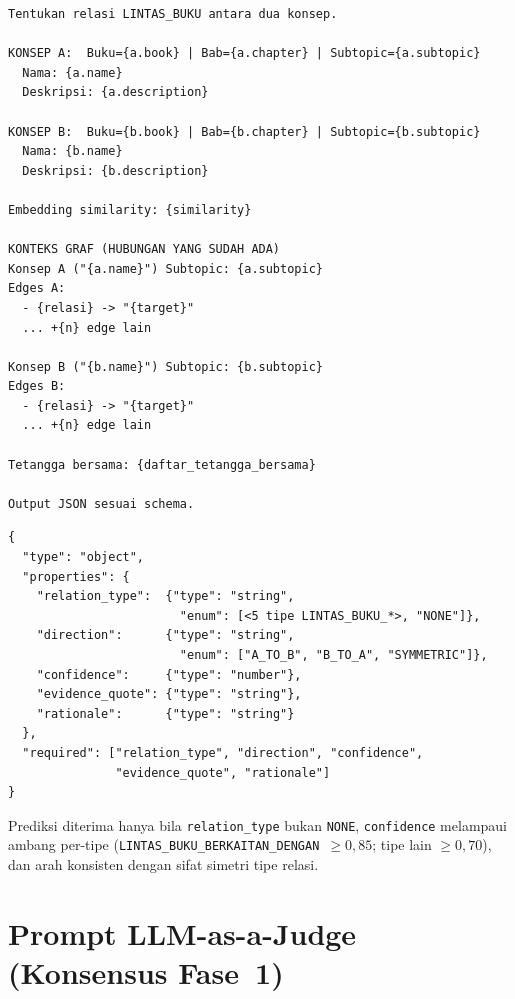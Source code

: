 \documentclass[main]{subfiles}
\begin{document}
\begin{lstlisting}[style=promptbox,caption={User prompt klasifikasi relasi (Pass-2). Blok \texttt{KONTEKS GRAF} memuat subtopik, hingga lima edge keluar tiap konsep, dan tetangga bersama.},label={lst:prompt-user}]
Tentukan relasi LINTAS_BUKU antara dua konsep.

KONSEP A:  Buku={a.book} | Bab={a.chapter} | Subtopic={a.subtopic}
  Nama: {a.name}
  Deskripsi: {a.description}

KONSEP B:  Buku={b.book} | Bab={b.chapter} | Subtopic={b.subtopic}
  Nama: {b.name}
  Deskripsi: {b.description}

Embedding similarity: {similarity}

KONTEKS GRAF (HUBUNGAN YANG SUDAH ADA)
Konsep A ("{a.name}") Subtopic: {a.subtopic}
Edges A:
  - {relasi} -> "{target}"
  ... +{n} edge lain

Konsep B ("{b.name}") Subtopic: {b.subtopic}
Edges B:
  - {relasi} -> "{target}"
  ... +{n} edge lain

Tetangga bersama: {daftar_tetangga_bersama}

Output JSON sesuai schema.
\end{lstlisting}

\begin{lstlisting}[style=promptbox,caption={Skema respons JSON yang dipaksakan pada keluaran model (Pass-2).},label={lst:prompt-schema}]
{
  "type": "object",
  "properties": {
    "relation_type":  {"type": "string",
                        "enum": [<5 tipe LINTAS_BUKU_*>, "NONE"]},
    "direction":      {"type": "string",
                        "enum": ["A_TO_B", "B_TO_A", "SYMMETRIC"]},
    "confidence":     {"type": "number"},
    "evidence_quote": {"type": "string"},
    "rationale":      {"type": "string"}
  },
  "required": ["relation_type", "direction", "confidence",
               "evidence_quote", "rationale"]
}
\end{lstlisting}

\noindent Prediksi diterima hanya bila \texttt{relation\_type} bukan
\texttt{NONE}, \texttt{confidence} melampaui ambang per-tipe
(\texttt{LINTAS\_BUKU\_BERKAITAN\_DENGAN}~$\geq 0{,}85$; tipe lain
$\geq 0{,}70$), dan arah konsisten dengan sifat simetri tipe relasi.

\section{Prompt LLM-as-a-Judge (Konsensus Fase~1)}
\label{lamp:prompt-judge}
\end{document}
